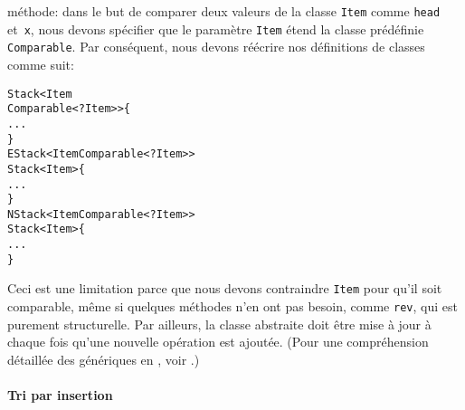 méthode: dans le but de comparer deux valeurs de la classe
\texttt{Item} comme \texttt{head} et~\texttt{x}, nous devons spécifier
que le paramètre \texttt{Item} étend la classe prédéfinie
\texttt{Comparable}. Par conséquent, nous devons réécrire nos
définitions de classes comme suit:
\begin{alltt}
\public \abstractX \class Stack<Item
\hfill\extends Comparable<? \super Item>> \{
  ...
\}
\public \class EStack<Item \extends Comparable<? \super Item>>
       \extends Stack<Item> \{
  ...
\}
\public \class NStack<Item \extends Comparable<? \super Item>>
       \extends Stack<Item> \{
  ...
\}
\end{alltt}
Ceci est une limitation parce que nous devons contraindre
\texttt{Item} pour qu'il soit comparable, même si quelques méthodes
n'en ont pas besoin, comme \texttt{rev}, qui est purement
structurelle. Par ailleurs, la classe abstraite doit être mise à jour
à chaque fois qu'une nouvelle opération est ajoutée. (Pour une
compréhension détaillée des génériques en \Java, voir
\cite{NaftalinWadler_2006}.)  

\paragraph{Tri par insertion}

